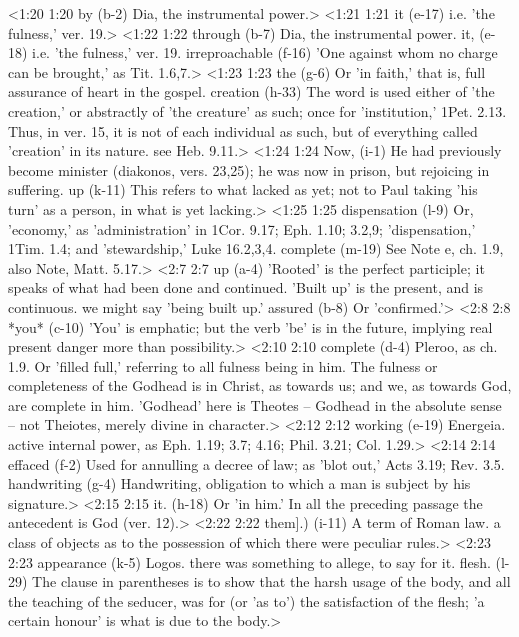 <1:20 1:20  by (b-2)  Dia, the instrumental power.>
<1:21 1:21  it (e-17)  i.e. 'the fulness,' ver. 19.>
<1:22 1:22  through (b-7)  Dia, the instrumental power.
  it, (e-18)  i.e. 'the fulness,' ver. 19.
  irreproachable (f-16)  'One against whom no charge can be brought,' as Tit. 1.6,7.>
<1:23 1:23  the (g-6)  Or 'in faith,' that is, full assurance of heart in the  gospel.
  creation (h-33)  The word is used either of 'the creation,' or abstractly of  'the creature' as such; once for 'institution,' 1Pet. 2.13.  Thus, in ver. 15, it is not of each individual as such, but of  everything called 'creation' in its nature. see Heb. 9.11.>
<1:24 1:24  Now, (i-1)  He had previously become minister (diakonos, vers. 23,25);  he was now in prison, but rejoicing in suffering.
  up (k-11)  This refers to what lacked as yet; not to Paul taking 'his  turn' as a person, in what is yet lacking.>
<1:25 1:25  dispensation (l-9)  Or, 'economy,' as 'administration' in 1Cor. 9.17; Eph. 1.10;  3.2,9; 'dispensation,' 1Tim. 1.4; and 'stewardship,' Luke 16.2,3,4.
  complete (m-19)  See Note e, ch. 1.9, also Note, Matt. 5.17.>
<2:7 2:7  up (a-4)  'Rooted' is the perfect participle; it speaks of what had  been done and continued. 'Built up' is the present, and is  continuous. we might say 'being built up.'
  assured (b-8)  Or 'confirmed.'>
<2:8 2:8  *you* (c-10)  'You' is emphatic; but the verb 'be' is in the future,  implying real present danger more than possibility.>
<2:10 2:10  complete (d-4)  Pleroo, as ch. 1.9. Or 'filled full,' referring to all  fulness being in him. The fulness or completeness of the  Godhead is in Christ, as towards us; and we, as towards God,  are complete in him. 'Godhead' here is Theotes -- Godhead in  the absolute sense -- not Theiotes, merely divine in  character.>
<2:12 2:12  working (e-19)  Energeia. active internal power, as Eph. 1.19; 3.7; 4.16;  Phil. 3.21; Col. 1.29.>
<2:14 2:14  effaced (f-2)  Used for annulling a decree of law; as 'blot out,' Acts 3.19;  Rev. 3.5.
  handwriting (g-4)  Handwriting, obligation to which a man is subject by his  signature.>
<2:15 2:15  it. (h-18)  Or 'in him.' In all the preceding passage the antecedent is  God (ver. 12).>
<2:22 2:22  them].) (i-11)  A term of Roman law. a class of objects as to the possession  of which there were peculiar rules.>
<2:23 2:23  appearance (k-5)  Logos. there was something to allege, to say for it.
  flesh. (l-29)  The clause in parentheses is to show that the harsh usage of  the body, and all the teaching of the seducer, was for (or 'as  to') the satisfaction of the flesh; 'a certain honour' is what  is due to the body.>
